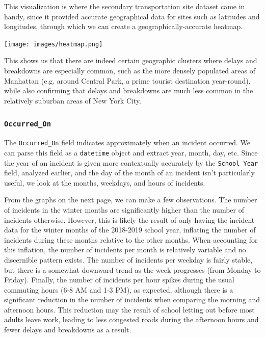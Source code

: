 \documentclass[11pt]{article}
\begin{document}
This visualization is where the secondary transportation site dataset came in handy, since it provided accurate geographical data for sites such as latitudes and longitudes, through which we can create a geographically-accurate heatmap.
\begin{center}
\texttt{[image: images/heatmap.png]}
\end{center}
This shows us that there are indeed certain geographic clusters where delays and breakdowns are especially common, such as the more densely populated areas of Manhattan (e.g. around Central Park, a prime tourist destination year-round), while also confirming that delays and breakdowns are much less common in the relatively suburban areas of New York City.

\subsubsection{\texttt{Occurred\_On}}
The \texttt{Occurred\_On} field indicates approximately when an incident occurred. We can parse this field as a \texttt{datetime} object and extract year, month, day, etc. Since the year of an incident is given more contextually accurately by the \texttt{School\_Year} field, analyzed earlier, and the day of the month of an incident isn't particularly useful, we look at the months, weekdays, and hours of incidents.

From the graphs on the next page, we can make a few observations. The number of incidents in the winter months are significantly higher than the number of incidents otherwise. However, this is likely the result of only having the incident data for the winter months of the 2018-2019 school year, inflating the number of incidents during these months relative to the other months. When accounting for this inflation, the number of incidents per month is relatively variable and no discernible pattern exists. The number of incidents per weekday is fairly stable, but there is a somewhat downward trend as the week progresses (from Monday to Friday). Finally, the number of incidents per hour spikes during the usual commuting hours (6-8 AM and 1-3 PM), as expected, although there is a significant reduction in the number of incidents when comparing the morning and afternoon hours. This reduction may the result of school letting out before most adults leave work, leading to less congested roads during the afternoon hours and fewer delays and breakdowns as a result.
\end{document}
